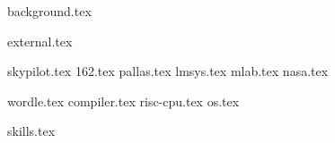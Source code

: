 \documentclass[11pt]{article}
\begin{document}
{background.tex}

{external.tex}

{skypilot.tex}
{162.tex}
{pallas.tex}
{lmsys.tex}
{mlab.tex}
{nasa.tex}

{wordle.tex}
{compiler.tex}
{risc-cpu.tex}
{os.tex}


{skills.tex}

\end{document}
